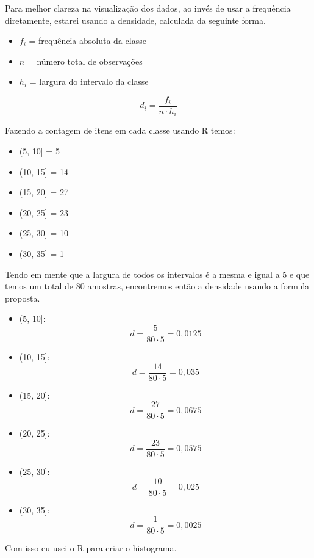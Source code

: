 \documentclass[a4paper,11pt]{article}
\begin{document}
\begin{description}
\vspace{5mm} %

Para melhor clareza na visualização dos dados, ao invés de usar a frequência diretamente, estarei usando a densidade, calculada da seguinte forma.

\begin{itemize}
    \item $f_i$ = frequência absoluta da classe
    \item $n$ = número total de observações
    \item $h_i$ = largura do intervalo da classe
\end{itemize}

\[d_i = \frac{f_i}{n \cdot h_i}\]

\vspace{5mm} %

Fazendo a contagem de itens em cada classe usando R temos:

\begin{itemize}
    \item (5, 10] = 5
    \item (10, 15] = 14
    \item (15, 20] = 27
    \item (20, 25] = 23
    \item (25, 30] = 10
    \item (30, 35] = 1
\end{itemize}

Tendo em mente que a largura de todos os intervalos é a mesma e igual a 5 e que temos um total de 80 amostras, encontremos então a densidade usando a formula proposta.

\begin{itemize}
    \item (5, 10]:
        \[d = \frac{5}{80 \cdot 5} = 0,0125 \]
    \item (10, 15]:
        \[d = \frac{14}{80 \cdot 5} = 0,035 \]
    \item (15, 20]:
        \[d = \frac{27}{80 \cdot 5} = 0,0675 \]
    \item (20, 25]:
        \[d = \frac{23}{80 \cdot 5} = 0,0575 \]
    \item (25, 30]:
        \[d = \frac{10}{80 \cdot 5} = 0,025 \]
    \item (30, 35]:
        \[d = \frac{1}{80 \cdot 5} = 0,0025 \]
\end{itemize}

Com isso eu usei o R para criar o histograma.


\end{description}
\end{document}
